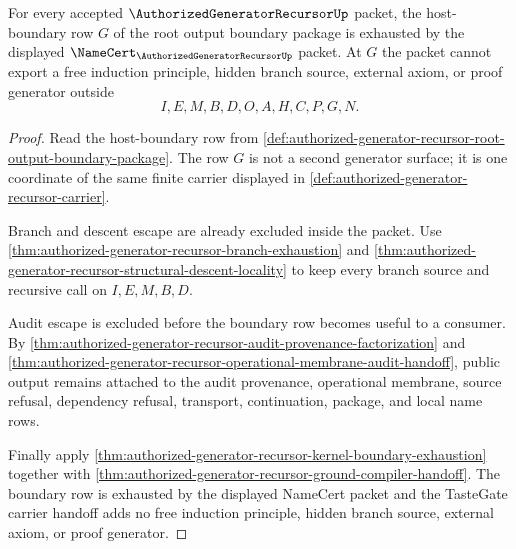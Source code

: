 \begin{theorem}
\label{thm:authorized-generator-recursor-root-host-boundary-namecert-exhaustion}
For every accepted $\AuthorizedGeneratorRecursorUp$ packet, the host-boundary row $G$ of the root output boundary package is exhausted by the displayed $\NameCert_{\AuthorizedGeneratorRecursorUp}$ packet. At $G$ the packet cannot export a free induction principle, hidden branch source, external axiom, or proof generator outside
$$
I,E,M,B,D,O,A,H,C,P,G,N.
$$
\end{theorem}
\begin{proof}
Read the host-boundary row from \autoref{def:authorized-generator-recursor-root-output-boundary-package}. The row $G$ is not a second generator surface; it is one coordinate of the same finite carrier displayed in \autoref{def:authorized-generator-recursor-carrier}.

Branch and descent escape are already excluded inside the packet. Use \autoref{thm:authorized-generator-recursor-branch-exhaustion} and \autoref{thm:authorized-generator-recursor-structural-descent-locality} to keep every branch source and recursive call on $I,E,M,B,D$.

Audit escape is excluded before the boundary row becomes useful to a consumer. By \autoref{thm:authorized-generator-recursor-audit-provenance-factorization} and \autoref{thm:authorized-generator-recursor-operational-membrane-audit-handoff}, public output remains attached to the audit provenance, operational membrane, source refusal, dependency refusal, transport, continuation, package, and local name rows.

Finally apply \autoref{thm:authorized-generator-recursor-kernel-boundary-exhaustion} together with \autoref{thm:authorized-generator-recursor-ground-compiler-handoff}. The boundary row is exhausted by the displayed NameCert packet and the TasteGate carrier handoff adds no free induction principle, hidden branch source, external axiom, or proof generator.
\end{proof}

